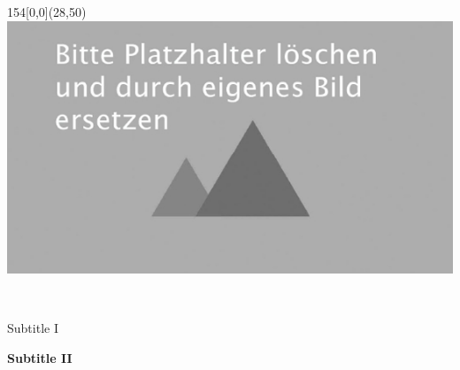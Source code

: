 %
%

\begin{titlepage}

    \begin{textblock}{154}[0,0](28,50)
        \includegraphics[scale=0.8]{images/placeholder.jpg}
    \end{textblock}

    \begin{flushleft}
        \vspace*{115mm}

        \fontsize{26pt}{28pt}\selectfont 
        \titel \\
        \vspace{2mm}

        \fontsize{16pt}{20pt}\selectfont\vspace{0.3em}
        Subtitle I \\
        \vspace{5mm}

        \fontsize{10pt}{12pt}\selectfont
        \textbf{Subtitle II} \\
        \vspace{3mm}
    \end{flushleft}

\end{titlepage}

